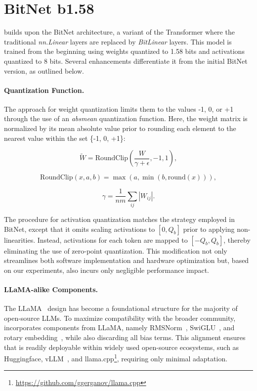 \section{BitNet b1.58}

 builds upon the BitNet architecture, a variant of the Transformer where the traditional \emph{nn.Linear} layers are replaced by \emph{BitLinear} layers. This model is trained from the beginning using weights quantized to 1.58 bits and activations quantized to 8 bits. Several enhancements differentiate it from the initial BitNet version, as outlined below.

\paragraph{Quantization Function.} The approach for weight quantization limits them to the values -1, 0, or +1 through the use of an \emph{absmean} quantization function. Here, the weight matrix is normalized by its mean absolute value prior to rounding each element to the nearest value within the set \{-1, 0, +1\}:

\begin{equation}
    \widetilde{W} = \mathrm{RoundClip}(\frac{W}{\gamma + \epsilon}, -1, 1),
\end{equation}

\begin{equation}
    \mathrm{RoundClip}(x, a, b) = \max(a, \min(b, \mathrm{round}(x))),
\end{equation}

\begin{equation}
    \gamma = \frac{1}{nm}\sum_{ij} |W_{ij}|.
\end{equation}

The procedure for activation quantization matches the strategy employed in BitNet, except that it omits scaling activations to $[0, Q_b]$ prior to applying non-linearities. Instead, activations for each token are mapped to $[-Q_b, Q_b]$, thereby eliminating the use of zero-point quantization. This modification not only streamlines both software implementation and hardware optimization but, based on our experiments, also incurs only negligible performance impact.

\paragraph{LLaMA-alike Components.}

The LLaMA~\cite{llama, llama2} design has become a foundational structure for the majority of open-source LLMs. To maximize compatibility with the broader community,  incorporates components from LLaMA, namely RMSNorm~\cite{rmsnorm}, SwiGLU~\cite{swiglu}, and rotary embedding~\cite{rope}, while also discarding all bias terms. This alignment ensures that  is readily deployable within widely used open-source ecosystems, such as Huggingface, vLLM~\cite{vllm}, and llama.cpp\footnote{\url{https://github.com/ggerganov/llama.cpp}}, requiring only minimal adaptation.

